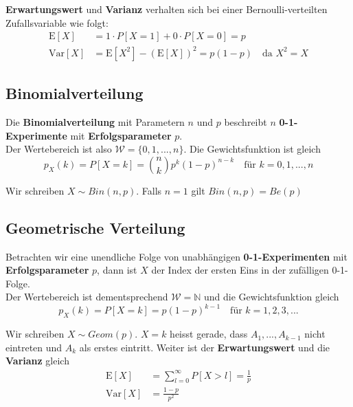 \documentclass[11pt]{article}
\newcommand{\E}{\text{E}}
\newcommand{\Var}{\text{Var}}
\begin{document}
\textbf{Erwartungswert} und \textbf{Varianz} verhalten sich bei einer Bernoulli-verteilten Zufallsvariable wie folgt:
\begin{equation*}
\begin{split}
	\E[X] & = 1 \cdot P[X = 1] + 0 \cdot P[X = 0] = p \\
	\Var[X] & = \E[X^2] - (\E[X])^2 = p(1-p) \quad \text{da } X^2 = X
\end{split}
\end{equation*}

\subsection{Binomialverteilung}

Die \textbf{Binomialverteilung} mit Parametern $n$ und $p$ beschreibt $n$ \textbf{0-1-Experimente} mit \textbf{Erfolgsparameter} $p$. \\
Der Wertebereich ist also $\mathcal{W} = \{0, 1, ..., n\}$. Die Gewichtsfunktion ist gleich
\begin{equation*}
	p_X(k) = P[X = k] = \binom{n}{k}p^k(1-p)^{n-k} \quad\text{f{\"u}r } k = 0, 1, ..., n
\end{equation*}

Wir schreiben $X \sim Bin(n,p)$. Falls $n = 1$ gilt $Bin(n,p) = Be(p)$

\subsection{Geometrische Verteilung}

Betrachten wir eine unendliche Folge von unabh{\"a}ngigen \textbf{0-1-Experimenten} mit \textbf{Erfolgsparameter} $p$, dann ist $X$ der Index der ersten Eins in der zuf{\"a}lligen 0-1-Folge. \\
Der Wertebereich ist dementsprechend $\mathcal{W} = \mathbb{N}$ und die Gewichtsfunktion gleich
\begin{equation*}
	p_X(k) = P[X = k] = p(1-p)^{k-1} \quad\text{f{\"u}r } k = 1, 2, 3,...
\end{equation*}

Wir schreiben $X \sim Geom(p)$. $X = k$ heisst gerade, dass $A_1,..., A_{k-1}$ nicht eintreten und $A_k$ als erstes eintritt. Weiter ist der \textbf{Erwartungswert} und die \textbf{Varianz} gleich
\begin{equation*}
\begin{split}
	\E[X] & = \sum_{l=0}^\infty P[X > l] = \frac{1}{p} \\
	\Var[X] & = \frac{1-p}{p^2}
\end{split}
\end{equation*}
\end{document}
